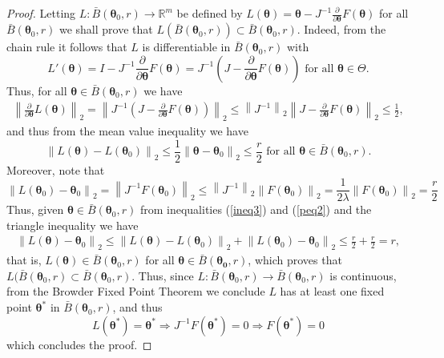 \documentclass[10pt,a4paper,onecolumn]{article} %
\newcommand{\bs}{\boldsymbol}
\begin{document}
\begin{appendix}
\begin{proof}
Letting $L:\bar{B}(\bs{\theta}_0,r)\to \mathbb{R}^m$ be defined by
$L(\bs{\theta})=\bs{\theta}-J^{-1} \frac{\partial}{\partial \bs{\theta}} F(\bs{\theta})$ for all $\bar{B}(\bs{\theta}_0,r)$
we shall prove that $L(\bar{B}(\bs{\theta}_0,r))\subset \bar{B}(\bs{\theta}_0,r)$. Indeed, from the chain rule it follows that $L$ is differentiable in $\bar{B}(\bs{\theta}_0,r)$ with
\begin{equation*}
L'(\bs{\theta})=I-J^{-1} \frac{\partial}{\partial \bs{\theta}}F(\bs{\theta})=J^{-1}\left(J-\frac{\partial}{\partial \bs{\theta}} F(\bs{\theta})\right)\mbox{ for all }\bs{\theta}\in \Theta.
\end{equation*}
Thus, for all $\bs{\theta}\in \bar{B}(\bs{\theta}_0,r)$ we have
\begin{equation*}
\begin{aligned}
\label{peq1}
\left\|\frac{\partial}{\partial \bs{\theta}} L(\bs{\theta})\right\|_2=\left\|J^{-1}\left(J-\frac{\partial}{\partial \bs{\theta}} F(\bs{\theta})\right)\right\|_2\leq \left\|J^{-1}\right\|_2\left\|J-\frac{\partial}{\partial \bs{\theta}} F(\bs{\theta})\right\|_2\leq \frac{1}{2},
\end{aligned}
\end{equation*}
and thus from the mean value inequality we have
\begin{equation}\label{ineq3}
\left\|L(\bs{\theta})-L(\bs{\theta}_0)\right\|_2\leq \frac{1}{2} \left\|\bs{\theta}-\bs{\theta}_0\right\|_2\leq \frac{r}{2}\mbox{ for all }\bs{\theta}\in \bar{B}(\bs{\theta}_0,r).
\end{equation}
Moreover, note that
\begin{equation}\label{peq2}\left\|L(\bs{\theta}_0)-\bs{\theta}_0\right\|_2=\left\|J^{-1}F(\bs{\theta}_0)\right\|_2\leq \left\|J^{-1}\right\|_2\left\|F(\bs{\theta}_0)\right\|_2 =\frac{1}{2\lambda}\left\|F(\bs{\theta}_0)\right\|_2=\frac{r}{2}
\end{equation}
Thus, given $\bs{\theta}\in \bar{B}(\bs{\theta}_0,r)$ from inequalities (\ref{ineq3}) and  (\ref{peq2}) and the triangle inequality we have
\begin{equation*}
\begin{aligned}
\left\|L(\bs{\theta})-\bs{\theta}_0\right\|_2\leq \left\|L(\bs{\theta})-L(\bs{\theta}_0)\right\|_2+\left\|L(\bs{\theta}_0)-\bs{\theta}_0\right\|_2\leq \frac{r}{2}+\frac{r}{2}= r,
\end{aligned}
\end{equation*}
that is, $L(\bs{\theta})\in \bar{B}(\bs{\theta}_0,r)$ for all $\bs{\theta}\in \bar{B}(\bs{\theta_0},r)$, which proves that $L(\bar{B}(\bs{\theta}_0,r)\subset \bar{B}(\bs{\theta}_0,r)$. Thus, since $L:\bar{B}(\bs{\theta}_0,r)\to \bar{B}( \bs{\theta}_0,r)$ is continuous, from the Browder Fixed Point Theorem we conclude $L$ has at least one fixed point $\bs{\theta}^*$ in $\bar{B}(\bs{\theta}_0,r)$, and thus
\begin{equation*}L(\bs{\theta}^*)=\bs{\theta}^*\Rightarrow J^{-1}F(\bs{\theta}^*)=0\Rightarrow F(\bs{\theta}^*)=0
\end{equation*}
which concludes the proof.
\end{proof}


\end{appendix}
\end{document}
